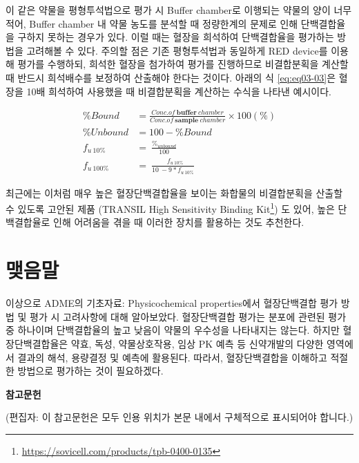 \documentclass[
  11pt,
  krantz2, a4paper, twoside]{krantz}
\begin{document}
이 같은 약물을 평형투석법으로 평가 시 Buffer chamber로 이행되는 약물의
양이 너무 적어, Buffer chamber 내 약물 농도를 분석할 때 정량한계의
문제로 인해 단백결합율을 구하지 못하는 경우가 있다. 이럴 때는 혈장을
희석하여 단백결합율을 평가하는 방법을 고려해볼 수 있다. 주의할 점은 기존
평형투석법과 동일하게 RED device를 이용해 평가를 수행하되, 희석한 혈장을
첨가하여 평가를 진행하므로 비결합분획을 계산할 때 반드시 희석배수를
보정하여 산출해야 한다는 것이다. 아래의 식 \eqref{eq:eq03-03}은 혈장을 10배 희석하여
사용했을 때 비결합분획을 계산하는 수식을 나타낸 예시이다.

\begin{equation}
\begin{split}
\% Bound &= \frac{Conc.of\ \mathbf{buffer}\ chamber}{Conc.of\ \mathbf{sample}\ chamber} \times 100(\%) \\
\% Unbound &= 100 - \% Bound \\
f_{u\ 10\%} &= \ \frac{\%_{unbound}}{100} \\ 
f_{u\ 100\%} &= \ \frac{{\ \ \ f}_{u\ 10\%}}{10\  - 9*f_{u\ 10\%}}
\end{split}
\label{eq:eq03-03} 
\end{equation}

최근에는 이처럼 매우 높은 혈장단백결합율을 보이는 화합물의 비결합분획을 산출할 수 있도록 고안된 제품 (TRANSIL High Sensitivity Binding Kit\footnote{\url{https://sovicell.com/products/tpb-0400-0135}}) 도 있어, 높은 단백결합율로 인해 어려움을 겪을 때 이러한 장치를 활용하는 것도 추천한다.

\hypertarget{uxb9fauxc74cuxb9d0-2}{%
\section{맺음말}\label{uxb9fauxc74cuxb9d0-2}}

이상으로 ADME의 기초자료: Physicochemical properties에서 혈장단백결합 평가 방법 및 평가 시 고려사항에 대해 알아보았다. 혈장단백결합 평가는 분포에 관련된 평가 중 하나이며 단백결합율의 높고 낮음이 약물의 우수성을 나타내지는 않는다. 하지만 혈장단백결합율은 약효, 독성, 약물상호작용, 임상 PK 예측 등 신약개발의 다양한 영역에서 결과의 해석, 용량결정 및 예측에 활용된다. 따라서, 혈장단백결합을 이해하고 적절한 방법으로 평가하는 것이 필요하겠다.

\textbf{참고문헌}

(편집자: 이 참고문헌은 모두 인용 위치가 본문 내에서 구체적으로 표시되어야 합니다.)
\end{document}
